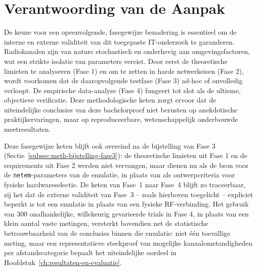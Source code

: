 \section{Verantwoording van de Aanpak}
\label{sec:meth-verantwoording}
 
De keuze voor een opeenvolgende, fasegewijze benadering is essentieel om de interne 
en externe validiteit van dit toegepaste IT-onderzoek te garanderen. Radiokanalen zijn van nature 
stochastisch en onderhevig aan omgevingsfactoren, wat een strikte isolatie van parameters 
vereist. Door eerst de theoretische limieten te analyseren (Fase 1) en om te zetten in harde 
netwerkeisen (Fase 2), wordt voorkomen dat de daaropvolgende testfase (Fase 3) ad-hoc of 
onvolledig verloopt. De empirische data-analyse (Fase 4) fungeert tot slot als de ultieme, 
objectieve verificatie. Deze methodologische keten zorgt ervoor dat de uiteindelijke 
conclusies van deze bachelorproef niet berusten op anekdotische praktijkervaringen, maar op 
reproduceerbare, wetenschappelijk onderbouwde meetresultaten.
 
Deze fasegewijze keten blijft ook overeind na de bijstelling van Fase 3
(Sectie~\ref{subsec:meth-bijstelling-fase3}): de theoretische limieten uit Fase 1 en de
requirements uit Fase 2 werden niet vervangen, maar dienen nu als de bron voor de
\texttt{netem}-parameters van de emulatie, in plaats van als ontwerpcriteria voor
fysieke hardwareselectie. De keten van Fase~1 naar Fase~4 blijft zo traceerbaar,
zij het dat de externe validiteit van Fase~3 -- zoals hierboven toegelicht -- expliciet
beperkt is tot een emulatie in plaats van een fysieke RF-verbinding. Het gebruik van 300
onafhankelijke, willekeurig gevarieerde trials in Fase 4, in plaats van een klein aantal
vaste metingen, versterkt bovendien net de statistische betrouwbaarheid van de
conclusies binnen die emulatie: niet één toevallige meting, maar een representatieve
steekproef van mogelijke kanaalomstandigheden per afstandscategorie bepaalt het
uiteindelijke oordeel in Hoofdstuk~\ref{ch:resultaten-en-evaluatie}.